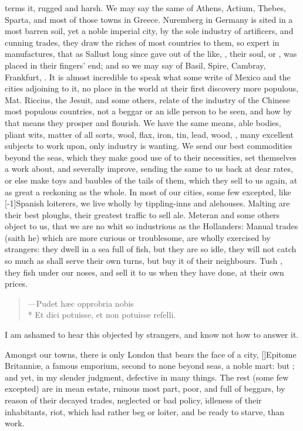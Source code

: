 terms it, rugged and harsh. We may say the same of Athens, Actium,
Thebes, Sparta, and most of those towns in Greece. Nuremberg in Germany
is sited in a most barren soil, yet a noble imperial city, by the sole
industry of artificers, and cunning trades, they draw the riches of
most countries to them, so expert in manufactures, that as Sallust long
since gave out of the like, ,
their soul, or , was placed in their fingers' end; and
so we may say of Basil, Spire, Cambray, Frankfurt, \etc{}. It is almost
incredible to speak what some write of Mexico and the cities adjoining
to it, no place in the world at their first discovery more populous,
Mat. Riccius, the Jesuit, and some others, relate of the industry
of the Chinese most populous countries, not a beggar or an idle person
to be seen, and how by that means they prosper and flourish. We have
the same means, able bodies, pliant wits, matter of all sorts, wool,
flax, iron, tin, lead, wood, \etc{}, many excellent subjects to work upon,
only industry is wanting. We send our best commodities beyond the seas,
which they make good use of to their necessities, set themselves a work
about, and severally improve, sending the same to us back at dear
rates, or else make toys and baubles of the tails of them, which they
sell to us again, at as great a reckoning as the whole. In most of our
cities, some few excepted, like [-1\baselineskip]Spanish loiterers, we live wholly
by tippling-inns and alehouses. Malting are their best ploughs, their
greatest traffic to sell ale. Meteran and some others object to
us, that we are no whit so industrious as the Hollanders: Manual trades
(saith he) which are more curious or troublesome, are wholly exercised
by strangers: they dwell in a sea full of fish, but they are so idle,
they will not catch so much as shall serve their own turns, but buy it
of their neighbours. Tush , they fish under our noses,
and sell it to us when they have done, at their own prices.
%
\begin{verse}
---\textlatin{Pudet h\ae{}c opprobria nobis}\\*
\textlatin{Et dici potuisse, et non potuisse refelli.}
\end{verse}

I am ashamed to hear this objected by strangers, and know not how to
answer it.

Amongst our towns, there is only London that bears the face of a
city, [\baselineskip]Epitome Britanni\ae{}, a famous emporium, second to none beyond
seas, a noble mart: but ; and yet, in
my slender judgment, defective in many things. The rest (some few
excepted) are in mean estate, ruinous most part, poor, and full of
beggars, by reason of their decayed trades, neglected or bad policy,
idleness of their inhabitants, riot, which had rather beg or loiter,
and be ready to starve, than work.

